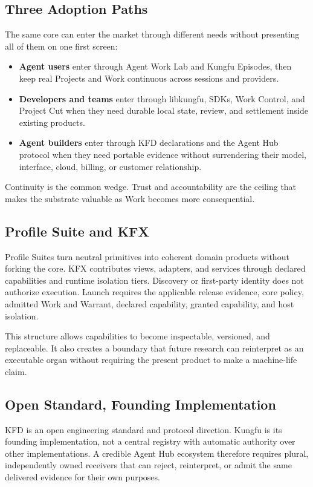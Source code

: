 \subsection{Three Adoption Paths}

The same core can enter the market through different needs without presenting
all of them on one first screen:

\begin{itemize}[leftmargin=*]
  \item \textbf{Agent users} enter through Agent Work Lab and Kungfu Episodes,
  then keep real Projects and Work continuous across sessions and providers.
  \item \textbf{Developers and teams} enter through libkungfu, SDKs, Work
  Control, and Project Cut when they need durable local state, review, and
  settlement inside existing products.
  \item \textbf{Agent builders} enter through KFD declarations and the Agent
  Hub protocol when they need portable evidence without surrendering their
  model, interface, cloud, billing, or customer relationship.
\end{itemize}

Continuity is the common wedge. Trust and accountability are the ceiling that
makes the substrate valuable as Work becomes more consequential.

\subsection{Profile Suite and KFX}

Profile Suites turn neutral primitives into coherent domain products without
forking the core. KFX contributes views, adapters, and services through
declared capabilities and runtime isolation tiers. Discovery or first-party
identity does not authorize execution. Launch requires the applicable release
evidence, core policy, admitted Work and Warrant, declared capability, granted
capability, and host isolation.

This structure allows capabilities to become inspectable, versioned, and
replaceable. It also creates a boundary that future research can reinterpret
as an executable organ without requiring the present product to make a
machine-life claim.

\subsection{Open Standard, Founding Implementation}

KFD is an open engineering standard and protocol direction. Kungfu is its
founding implementation, not a central registry with automatic authority over
other implementations. A credible Agent Hub ecosystem therefore requires
plural, independently owned receivers that can reject, reinterpret, or admit
the same delivered evidence for their own purposes.
